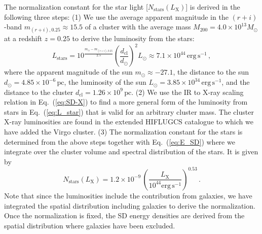 \documentclass[10pt,aps,pra,reprint,amsmath,amsfonts,amssymb,showpacs]{revtex4-1}
\newcommand{\rmn}{\mathrm}
\newcommand{\clu}{\rmn{cl}}
\newcommand{\msun}{M_\odot}
\newcommand{\stars}{\rmn{stars}}
\newcommand{\lx}{L_\rmn{X}}
\newcommand{\mvir}{M_{200}}
\begin{document}
The normalization constant for the star light [$N_\stars(\lx)$] is derived
in the following three steps: (1) We use the average apparent magnitude
in the $(r+i)$-band $m_{(r+i),0.25}\approx 15.5$
\cite{2005MNRAS.358..949Z} of a cluster with the average mass
$\mvir=4.0\times10^{13}\msun$ at a redshift $z=0.25$ to derive the
luminosity from the stars:
\begin{equation}
L_\stars=10^{\frac{m_\odot-m_{(r+i),0.25}}{2.5}}
\left(\frac{d_\clu}{d_\odot}\right)^2 L_\odot
\approx 7.1\times10^{44}\,\rmn{erg}\,\rmn{s}^{-1}\,,
\label{eq:L_star}
\end{equation}
where the apparent magnitude of the sun $m_\odot\approx -27.1$, the
distance to the sun $d_\odot=4.85\times10^{-6}\,\rmn{pc}$, the
luminosity of the sun $L_\odot=3.85\times10^{34}\,\rmn{erg\,s}^{-1}$,
and the distance to the cluster $d_\clu=1.26\times10^9\,\rmn{pc}$. (2)
We use the IR to X-ray scaling relation in Eq.~(\ref{eq:SD-X}) to find
a more general form of the luminosity from stars in
Eq.~(\ref{eq:L_star}) that is valid for an arbitrary cluster mass. The
cluster X-ray luminosities are found in the extended HIFLUGCS
catalogue \cite{2002ApJ...567..716R} to which we have added the Virgo
cluster. (3) The normalization constant for the stars is
determined from the above steps together with Eq.~(\ref{eq:E_SD})
where we integrate over the cluster volume and spectral distribution
of the stars. It is given by
\begin{equation}
 N_\stars(\lx) = 1.2\times10^{-9}\,
\left(\frac{\lx}{10^{44}\rmn{erg\,s}^{-1}}\right)^{0.53}\,.
\label{eq:N_stars}
\end{equation}
Note that since the luminosities include the contribution from
galaxies, we have integrated the spatial distribution including
galaxies to derive the normalization. Once the normalization is fixed,
the SD energy densities are derived from the spatial distribution
where galaxies have been excluded.
\end{document}
